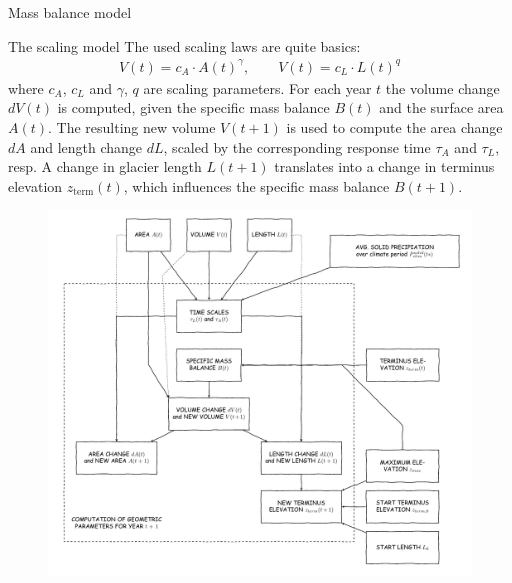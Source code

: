 \documentclass[final]{beamer}
\begin{document}
\begin{frame}[fragile]
\begin{columns}[t]
\begin{leftcolumn}
\begin{boxblock}{Mass balance model}
      
   \end{boxblock}

   \begin{boxblock}{The scaling model}
      The used scaling laws are quite basics:
      \begin{align}
         V(t) = c_A \cdot A(t)^\gamma, \qquad
         V(t) = c_L \cdot L(t)^q
      \end{align}
      where $c_A$, $c_L$ and $\gamma$, $q$ are scaling parameters.
      For each year $t$ the volume change $dV(t)$ is computed, given the specific mass balance $B(t)$ and the surface area $A(t)$. The resulting new volume $V(t+1)$ is used to compute the area change $dA$ and length change $dL$, scaled by the corresponding response time $\tau_A$ and $\tau_L$, resp. A change in glacier length $L(t+1)$ translates into a change in terminus elevation $z_\text{term}(t)$, which influences the specific mass balance $B(t+1)$.
      \begin{figure}
         \centering
         \includegraphics[width=1\textwidth]{../flowchart/scaling.pdf}
         \label{fig:flowchart}
      \end{figure}


\end{boxblock}
\end{leftcolumn}
\end{columns}
\end{frame}
\end{document}
